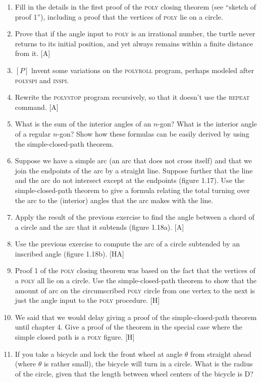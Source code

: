 \documentclass{book}
\begin{document}
\begin{enumerate}
\item Fill in the details in the first proof of the \textsc{poly} closing theorem (see
``sketch of proof 1''), including a proof that the vertices of \textsc{poly} lie on a
circle.  
\item Prove that if the angle input to \textsc{poly} is an irrational number, the
turtle never returns to its initial position, and yet always remains within
a finite distance from it. [A]
\item $[P]$ lnvent some variations on the \textsc{polyroll} program, perhaps modeled
after \textsc{polyspi} and \textsc{inspi}.
\item Rewrite the \textsc{polystop} program recursively, so that it doesn't use the
\textsc{repeat} command. [A]
\item What is the sum of the interior angles of an $n$-gon? What is the
interior angle of a regular $n$-gon? Show how these formulas can be easily
derived by using the simple-closed-path theorem.  
\item Suppose we have a simple arc (an arc that does not cross itself) and
that we join the endpoints of the arc by a straight line. Suppose further
that the line and the arc do not intersect except at the endpoints (figure
1.17).  Use the simple-closed-path theorem to give a formula relating the 
total turning over the arc to the (interior) angles that the arc makes with
the line.  
\item Apply the result of the previous exercise to find the angle between a
chord of a circle and the arc that it subtends (figure 1.18a). [A]
\item Use the previous exercise to compute the arc of a circle subtended by
an inscribed angle (figure 1.18b). [HA]
\item Proof 1 of the \textsc{poly} closing theorem was based on the fact that the
vertices of a \textsc{poly} all lie on a circle. Use the simple-closed-path theorem
to show that the amount of arc on the circumscribed \textsc{poly} circle from
one vertex to the next is just the angle input to the \textsc{poly} procedure. [H]
\item We said that we would delay giving a proof of the simple-closed-path
theorem until chapter 4. Give a proof of the theorem in the special case
where the simple closed path is a \textsc{poly} figure. [H]
\item If you take a bicycle and lock the front wheel at angle $\theta$ from straight
ahead (where $\theta$ is rather small), the bicycle will turn in a circle. What
is the radius of the circle, given that the length between wheel centers
of the bicycle is D?  
\end{enumerate}
\end{document}

